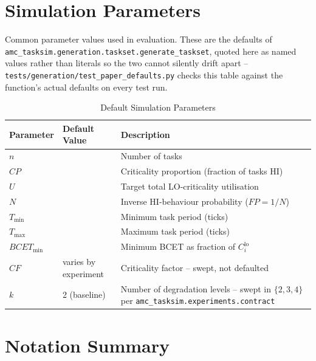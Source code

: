 \documentclass{article}
\begin{document}
\section{Simulation Parameters}

Common parameter values used in evaluation. These are the defaults of
\texttt{amc\_tasksim.generation.taskset.generate\_taskset}, quoted here as
named values rather than literals so the two cannot silently drift apart --
\texttt{tests/generation/test\_paper\_defaults.py} checks this table against
the function's actual defaults on every test run.

\begin{table}[h]
\centering
\caption{Default Simulation Parameters}
\begin{tabular}{lll}
\toprule
Parameter & Default Value & Description \\
\midrule
$n$ & {} & Number of tasks \\
$CP$ & {} & Criticality proportion (fraction of tasks HI) \\
$U$ & {} & Target total LO-criticality utilisation \\
$N$ & {} & Inverse HI-behaviour probability ($FP = 1/N$) \\
$T_{\min}$ & {} & Minimum task period (ticks) \\
$T_{\max}$ & {} & Maximum task period (ticks) \\
$BCET_{\mathrm{min}}$ & {} & Minimum BCET as fraction of $C_i^{\mathrm{lo}}$ \\
\midrule
$CF$ & varies by experiment & Criticality factor -- swept, not defaulted \\
$k$ & 2 (baseline) & Number of degradation levels -- swept in $\{2,3,4\}$ per \texttt{amc\_tasksim.experiments.contract} \\
\bottomrule
\end{tabular}
\end{table}

\section{Notation Summary}
\end{document}
